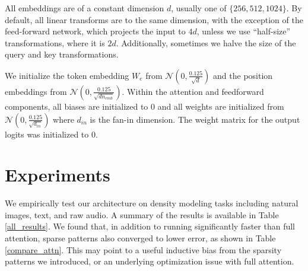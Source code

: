 \documentclass{article}
\begin{document}
All embeddings are of a constant dimension $d$, usually one of $\{256, 512, 1024\}$. By default, all linear transforms are to the same dimension, with the exception of the feed-forward network, which projects the input to $4d$, unless we use ``half-size'' transformations, where it is $2d$. Additionally, sometimes we halve the size of the query and key transformations.

We initialize the token embedding $W_e$ from $\mathcal{N}(0, \frac{0.125}{\sqrt{d}})$ and the position embeddings from $\mathcal{N}(0, \frac{0.125}{\sqrt{dn_{emb}}})$. Within the attention and feedforward components, all biases are initialized to 0 and all weights are initialized from $\mathcal{N}(0, \frac{0.125}{\sqrt{d_{in}}})$ where $d_{in}$ is the fan-in dimension. The weight matrix for the output logits was initialized to 0.

\section{Experiments}
We empirically test our architecture on density modeling tasks including natural images, text, and raw audio. A summary of the results is available in Table \ref{all_results}. We found that, in addition to running significantly faster than full attention, sparse patterns also converged to lower error, as shown in Table \ref{compare_attn}. This may point to a useful inductive bias from the sparsity patterns we introduced, or an underlying optimization issue with full attention.
\end{document}
